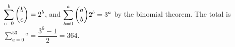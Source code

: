$\displaystyle\sum_{c=0}^b\dbinom bc=2^b$, and $\displaystyle\sum_{b=0}^a\dbinom ab2^b=3^a$ by the binomial theorem. The total is $\displaystyle\sum_{a=0}^53^a=\dfrac{3^6-1}2=\boxed{364}$.
